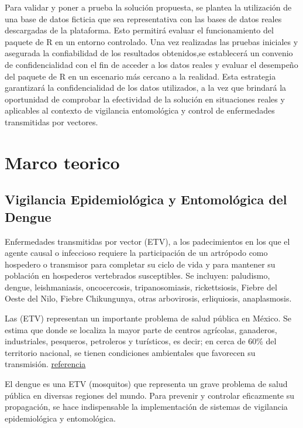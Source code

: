\documentclass[
  letterpaper,
]{scrbook}
\begin{document}
Para validar y poner a prueba la solución propuesta, se plantea la
utilización de una base de datos ficticia que sea representativa con las
bases de datos reales descargadas de la plataforma. Esto permitirá
evaluar el funcionamiento del paquete de R en un entorno controlado. Una
vez realizadas las pruebas iniciales y asegurada la confiabilidad de los
resultados obtenidos,se establecerá un convenio de confidencialidad con
el fin de acceder a los datos reales y evaluar el desempeño del paquete
de R en un escenario más cercano a la realidad. Esta estrategia
garantizará la confidencialidad de los datos utilizados, a la vez que
brindará la oportunidad de comprobar la efectividad de la solución en
situaciones reales y aplicables al contexto de vigilancia entomológica y
control de enfermedades transmitidas por vectores.


\chapter{Marco teorico}\label{marco-teorico}

\section{Vigilancia Epidemiológica y Entomológica del
Dengue}\label{vigilancia-epidemioluxf3gica-y-entomoluxf3gica-del-dengue}

Enfermedades transmitidas por vector (ETV), a los padecimientos en los
que el agente causal o infeccioso requiere la participación de un
artrópodo como hospedero o transmisor para completar su ciclo de vida y
para mantener su población en hospederos vertebrados susceptibles. Se
incluyen: paludismo, dengue, leishmaniasis, oncocercosis,
tripanosomiasis, rickettsiosis, Fiebre del Oeste del Nilo, Fiebre
Chikungunya, otras arbovirosis, erliquiosis, anaplasmosis.

Las (ETV) representan un importante problema de salud pública en México.
Se estima que donde se localiza la mayor parte de centros agrícolas,
ganaderos, industriales, pesqueros, petroleros y turísticos, es decir;
en cerca de 60\% del territorio nacional, se tienen condiciones
ambientales que favorecen su transmisión.
\href{https://www.gob.mx/salud/cenaprece/acciones-y-programas/direccion-del-programa-de-enfermedades-transmitidas-por-vectores}{referencia}

El dengue es una ETV (mosquitos) que representa un grave problema de
salud pública en diversas regiones del mundo. Para prevenir y controlar
eficazmente su propagación, se hace indispensable la implementación de
sistemas de vigilancia epidemiológica y entomológica.
\end{document}
